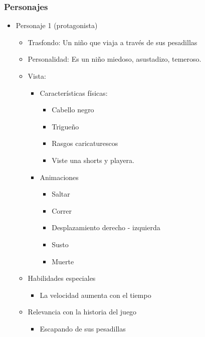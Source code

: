 \subsubsection{Personajes}
\begin{itemize}
	\item Personaje 1 (protagonista)
	      \begin{itemize}
		      \item Trasfondo: Un niño que viaja a través de sus pesadillas
		      \item Personalidad: Es un niño miedoso, asustadizo, temeroso.
		      \item Vista:
		            \begin{itemize}
			            \item Características físicas:
			                  \begin{itemize}
				                  \item Cabello negro
				                  \item Trigueño
				                  \item Rasgos caricaturescos
				                  \item Viste una shorts y playera.
			                  \end{itemize}
			            \item Animaciones
			                  \begin{itemize}
				                  \item Saltar
				                  \item Correr
				                  \item Desplazamiento derecho - izquierda
				                  \item Susto
				                  \item Muerte
			                  \end{itemize}
		            \end{itemize}
		      \item Habilidades especiales
		            \begin{itemize}
			            \item La velocidad aumenta con el tiempo
		            \end{itemize}
		      \item Relevancia con la historia del juego
		            \begin{itemize}
			            \item Escapando de sus pesadillas
		            \end{itemize}

\end{itemize}
\end{itemize}
